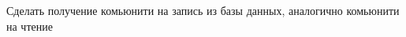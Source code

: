 
\begin{DoxyRefList}
\item[\label{todo__todo000001}%
\hypertarget{todo__todo000001}{}%
Глобальный \hyperlink{class_connect___s_n_m_p_a8a4beac9f8314f8e4f86f29b4cf619a0}{Connect\-\_\-\-S\-N\-M\-P\-:\-:\-\_\-\-\_\-construct} (\$switch\-\_\-ip, \$wr\-\_\-rd= 'r')]Сделать получение комьюнити на запись из базы данных, аналогично комьюнити на чтение
\end{DoxyRefList}